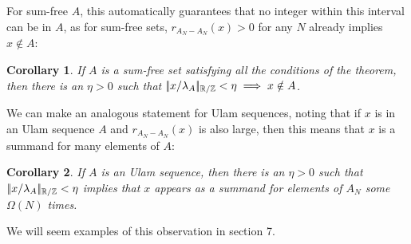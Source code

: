 \documentclass{report}
\newtheorem{corollary}{Corollary}[theorem]
\theoremstyle{remark}
\numberwithin{equation}{section}
\begin{document}
For sum-free $A$, this automatically guarantees that no integer within
this interval can be in $A$, as for sum-free sets, $r_{A_N-A_N}(x) >
0$ for any $N$ already implies $x \notin A$: 

\begin{corollary}
If $A$ is a sum-free set satisfying all the conditions of the theorem,
then there is an $\eta > 0$ such that $|\!|x/\lambda_A|\!|_{\mathbb{R}/\mathbb{Z}} < \eta
\implies x \notin A$.  
\end{corollary}

We can make an analogous statement for Ulam sequences, noting that if
$x$ is in an Ulam sequence $A$ and $r_{A_N - A_N}(x)$ is also large,
then this means that $x$ is a summand for many elements of $A$: 

\begin{corollary}If $A$ is an Ulam sequence, then there is an
  $\eta > 0$ such that $|\!|x/\lambda_A|\!|_{\mathbb{R}/\mathbb{Z}} < \eta$ implies that $x$
  appears as a summand for elements of $A_N$ some $\Omega(N)$ times.
\end{corollary}

We will seem examples of this observation in section 7.







\end{document}
